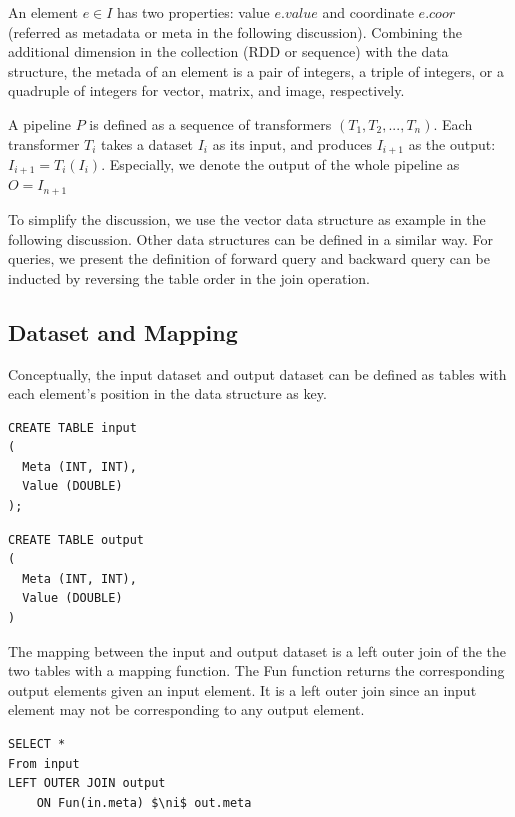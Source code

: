 \documentclass{sig-alternate}
\begin{document}
An element $e \in I$ has two properties: value $e.value$ and coordinate $e.coor$ (referred as metadata or meta
in the following discussion). 
Combining the additional dimension in the collection (RDD or sequence) with the data structure, 
the metada of an element is a pair of integers, a triple of integers, or a quadruple of integers
for vector, matrix, and image, respectively.

A pipeline $P$ is defined as a sequence of transformers $(T_1, T_2, ..., T_n)$. 
Each transformer $T_i$ takes a dataset $I_i$ as its input, and produces $I_{i+1}$ as the output: 
$I_{i+1} = T_i(I_i)$. 
Especially, we denote the output of the whole pipeline as $O = I_{n+1}$

To simplify the discussion, we use the vector data structure as example in the following discussion.
Other data structures can be defined in a similar way. 
For queries, we present the definition of forward query and backward query can be inducted by reversing
the table order in the join operation.

\subsection{Dataset and Mapping}
Conceptually, the input dataset and output dataset can be defined
as tables with each element's position in the data structure as key.
\newline\newline
\noindent\begin{minipage}{\textwidth}
\noindent\begin{minipage}{.2\textwidth}
\begin{verbatim}
CREATE TABLE input
(
  Meta (INT, INT),
  Value (DOUBLE)
);
\end{verbatim}
\end{minipage} 
\qquad{\color{black}\vrule}\qquad
\begin{minipage}{.2\textwidth}
\begin{verbatim}
CREATE TABLE output
(
  Meta (INT, INT),
  Value (DOUBLE)
)
\end{verbatim}
\end{minipage}
\end{minipage}
\vspace{2ex}

The mapping between the input and output dataset is a left outer join of the the two tables with a mapping function.
The Fun function returns the corresponding output elements given an input element. 
It is a left outer join since an input element may not be corresponding to any output element.
\begin{lstlisting}
SELECT *
From input
LEFT OUTER JOIN output 
    ON Fun(in.meta) $\ni$ out.meta
\end{lstlisting}
\end{document}
